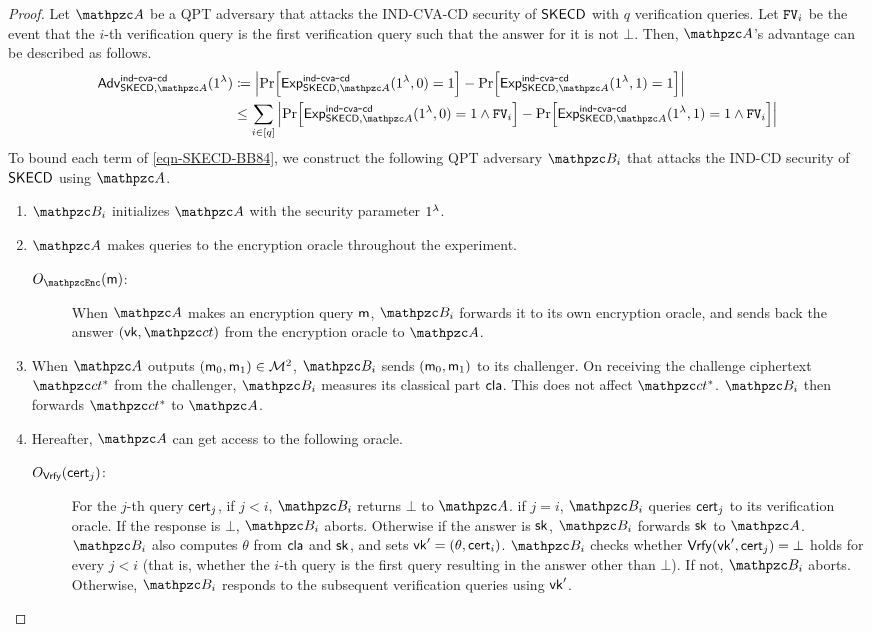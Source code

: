 \begin{proof}
Let $\qA$ be a QPT adversary that attacks the IND-CVA-CD security of $\mathsf{SKECD}$ with $q$ verification queries.
Let $\mathtt{FV}_i$ be the event that the $i$-th verification query is the first verification query such that the answer for it is not $\bot$.
Then, $\qA$'s advantage can be described as follows.
\begin{align}
\advc{\CDSKE,\qA}{ind}{cva}{cd}(1^\secp)
&\seteq \abs{
\Pr[\expc{\CDSKE,\qA}{ind}{cva}{cd}(1^\secp, 0)=1]
-\Pr[\expc{\CDSKE,\qA}{ind}{cva}{cd}(1^\secp, 1)=1]
}\\
&\le \sum_{i\in[q]} \abs{
\Pr[\expc{\CDSKE,\qA}{ind}{cva}{cd}(1^\secp, 0)=1 \land \FV_i]
-\Pr[\expc{\CDSKE,\qA}{ind}{cva}{cd}(1^\secp, 1)=1 \land \FV_i]\label{eqn-SKECD-BB84}
}\\
\end{align}
To bound each term of \cref{eqn-SKECD-BB84}, we construct the following QPT adversary $\qB_i$ that attacks the IND-CD security of $\mathsf{SKECD}$ using $\qA$.

\begin{enumerate}
    \item $\qB_i$ initializes $\qA$ with the security parameter $1^\lambda$.
    \item $\qA$ makes queries to the encryption oracle throughout the experiment.
    \begin{description}
    \item[$\Oracle{\qEnc}(\msg)$:] When $\qA$ makes an encryption query $\mathsf{m}$, $\qB_i$ forwards it to its own encryption oracle, and sends back the answer $(\vk,\qct)$ from the encryption oracle to $\qA$.
    \end{description}
    \item When $\qA$ outputs $(\mathsf{m}_0,\mathsf{m}_1)\in\mathcal{M}^2$, $\qB_i$ sends $(\mathsf{m}_0,\mathsf{m}_1)$ to its challenger. On receiving the challenge ciphertext $\qct^*$ from the challenger, $\qB_i$ measures its classical part $\mathsf{cla}$. This does not affect $\qct^*$. $\qB_i$ then forwards $\qct^*$ to $\qA$.
    \item Hereafter, $\qA$ can get access to the following oracle.
    \begin{description}
        \item[$O_{\mathtt{\mathsf{Vrfy}}}(\mathsf{cert}_j)$:] For the $j$-th query $\mathsf{cert}_j$, if $j<i$, $\qB_i$ returns $\bot$ to $\qA$. if $j=i$, $\qB_i$ queries $\mathsf{cert}_j$ to its verification oracle. If the response is $\bot$, $\qB_i$ aborts. Otherwise if the answer is $\mathsf{sk}$, $\qB_i$ forwards $\mathsf{sk}$ to $\qA$. $\qB_i$ also computes $\theta$ from $\mathsf{cla}$ and $\mathsf{sk}$, and sets $\mathsf{vk}^\prime=(\theta,\mathsf{cert}_i)$. $\qB_i$ checks whether $\mathsf{Vrfy}(\mathsf{vk}^\prime,\mathsf{cert}_j)=\bot$ holds for every $j<i$ (that is, whether the $i$-th query is the first query resulting in the answer other than $\bot$). If not, $\qB_i$ aborts. Otherwise, $\qB_i$ responds to the subsequent verification queries using $\mathsf{vk}^\prime$.
       

\end{description}
\end{enumerate}
\end{proof}
